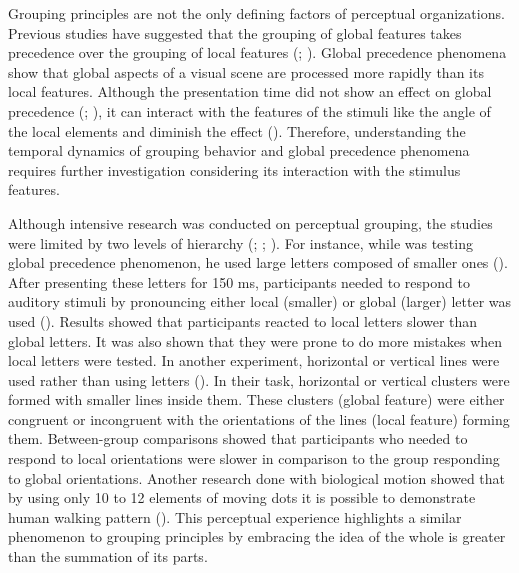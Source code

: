 \documentclass{article}
\begin{document}
Grouping principles are not the only defining factors of perceptual organizations. Previous studies have suggested that the grouping of global features takes precedence over the grouping of local features (\cite{RN196}; \cite{RN194}). Global precedence phenomena show that global aspects of a visual scene are processed more rapidly than its local features. Although the presentation time did not show an effect on global precedence (\cite{luna1995selective}; \cite{luna1993effects}), it can interact with the features of the stimuli like the angle of the local elements and diminish the effect (\cite{luna1995selective}). Therefore, understanding the temporal dynamics of grouping behavior and global precedence phenomena requires further investigation considering its interaction with the stimulus features. 

Although intensive research was conducted on perceptual grouping, the studies were limited by two levels of hierarchy (\cite{RN195};  \cite{RN191};  \cite{RN232}). For instance, while \citeauthor{RN196} was testing global precedence phenomenon, he used large letters composed of smaller ones (\citeyear{RN196}). After presenting these letters for 150 ms, participants needed to respond to auditory stimuli by pronouncing either local (smaller) or global (larger) letter was used (\cite{stroop1935studies}). Results showed that participants reacted to local letters slower than  global letters. It was also shown that they were prone to do more mistakes when local letters were tested. In another experiment, horizontal or vertical lines were used rather than using letters (\cite{RN232}). In their task, horizontal or vertical clusters were formed with smaller lines inside them. These clusters (global feature) were either congruent or incongruent with the orientations of the lines (local feature) forming them. Between-group comparisons showed that participants who needed to respond to local orientations were slower in comparison to the group responding to global orientations. Another research done with biological motion showed that by using only 10 to 12 elements of moving dots it is possible to demonstrate human walking pattern (\cite{johansson1973visual}). This perceptual experience highlights a similar phenomenon to grouping principles by embracing the idea of the whole is greater than the summation of its parts. 
\end{document}
